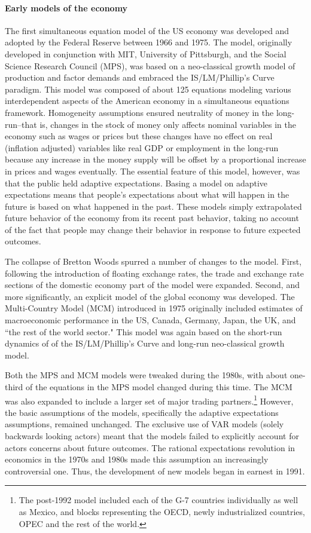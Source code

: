 \documentclass[a4paper]{article}
\begin{document}
\paragraph{Early models of the economy}
The first simultaneous equation model of the US economy was developed and adopted by the Federal Reserve between 1966 and 1975. The model, originally developed in conjunction with MIT, University of Pittsburgh, and the Social Science Research Council (MPS), was based on a neo-classical growth model of production and factor demands and embraced the IS/LM/Phillip's Curve paradigm. This model was composed of about 125 equations modeling various interdependent aspects of the American economy in a simultaneous equations framework. Homogeneity assumptions ensured neutrality of money in the long-run--that is, changes in the stock of money only affects nominal variables in the economy such as wages or prices but these changes have no effect on real (inflation adjusted) variables like real GDP or employment in the long-run because any increase in the money supply will be offset by a proportional increase in prices and wages eventually. The essential feature of this model, however, was that the public held adaptive expectations. Basing a model on adaptive expectations means that people's expectations about what will happen in the future is based on what happened in the past. These models simply extrapolated future behavior of the economy from its recent past behavior, taking no account of the fact that people may change their behavior in response to future expected outcomes.

The collapse of Bretton Woods spurred a number of changes to the model. First, following the introduction of floating exchange rates, the trade and exchange rate sections of the domestic economy part of the model were expanded. Second, and more significantly, an explicit model of the global economy was developed. The Multi-Country Model (MCM) introduced in 1975 originally included estimates of macroeconomic performance in the US, Canada, Germany, Japan, the UK, and ``the rest of the world sector." This model was again based on the short-run dynamics of of the IS/LM/Phillip's Curve and long-run neo-classical growth model.

Both the MPS and MCM models were tweaked during the 1980s, with about one-third of the equations in the MPS model changed during this time. The MCM was also expanded to include a larger set of major trading partners.\footnote{The post-1992 model included each of the G-7 countries individually as well as Mexico, and blocks representing the OECD, newly industrialized countries, OPEC and the rest of the world.} However, the basic assumptions of the models, specifically the adaptive expectations assumptions, remained unchanged. The exclusive use of VAR models (solely backwards looking actors) meant that the models failed to explicitly account for actors concerns about future outcomes. The rational expectations revolution in economics in the 1970s and 1980s made this assumption an increasingly controversial one. Thus, the development of new models began in earnest in 1991.
 
\end{document}
